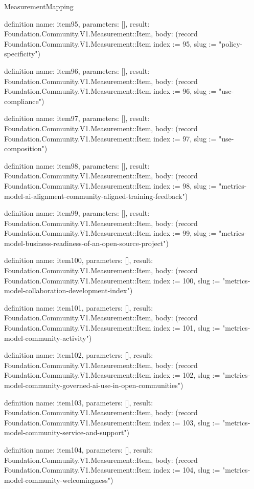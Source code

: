 \begin{lexlean}{MeasurementMapping}
\begin{semanticmodule}
definition{
  name: item95,
  parameters: [],
  result: Foundation.Community.V1.Measurement::Item,
  body: (record Foundation.Community.V1.Measurement::Item {index := 95, slug := "policy-specificity"})
}

definition{
  name: item96,
  parameters: [],
  result: Foundation.Community.V1.Measurement::Item,
  body: (record Foundation.Community.V1.Measurement::Item {index := 96, slug := "use-compliance"})
}

definition{
  name: item97,
  parameters: [],
  result: Foundation.Community.V1.Measurement::Item,
  body: (record Foundation.Community.V1.Measurement::Item {index := 97, slug := "use-composition"})
}

definition{
  name: item98,
  parameters: [],
  result: Foundation.Community.V1.Measurement::Item,
  body: (record Foundation.Community.V1.Measurement::Item {index := 98, slug := "metrics-model-ai-alignment-community-aligned-training-feedback"})
}

definition{
  name: item99,
  parameters: [],
  result: Foundation.Community.V1.Measurement::Item,
  body: (record Foundation.Community.V1.Measurement::Item {index := 99, slug := "metrics-model-business-readiness-of-an-open-source-project"})
}

definition{
  name: item100,
  parameters: [],
  result: Foundation.Community.V1.Measurement::Item,
  body: (record Foundation.Community.V1.Measurement::Item {index := 100, slug := "metrics-model-collaboration-development-index"})
}

definition{
  name: item101,
  parameters: [],
  result: Foundation.Community.V1.Measurement::Item,
  body: (record Foundation.Community.V1.Measurement::Item {index := 101, slug := "metrics-model-community-activity"})
}

definition{
  name: item102,
  parameters: [],
  result: Foundation.Community.V1.Measurement::Item,
  body: (record Foundation.Community.V1.Measurement::Item {index := 102, slug := "metrics-model-community-governed-ai-use-in-open-communities"})
}

definition{
  name: item103,
  parameters: [],
  result: Foundation.Community.V1.Measurement::Item,
  body: (record Foundation.Community.V1.Measurement::Item {index := 103, slug := "metrics-model-community-service-and-support"})
}

definition{
  name: item104,
  parameters: [],
  result: Foundation.Community.V1.Measurement::Item,
  body: (record Foundation.Community.V1.Measurement::Item {index := 104, slug := "metrics-model-community-welcomingness"})
}


\end{semanticmodule}
\end{lexlean}
